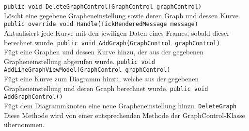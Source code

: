 \begin{itemize}
	\add \verb!public void DeleteGraphControl(GraphControl graphControl)! \\
	Löscht eine gegebene Grapheneinstellung sowie deren Graph und dessen Kurve.
	\add \verb!public override void Handle(TickRenderedMessage message)! \\
	Aktualisiert jede Kurve mit den jewiligen Daten eines Frames, sobald dieser berechnet wurde.
	\change \verb!public void AddGraph(GraphControl graphControl)! \\
	Fügt eine Graphen und dessen Kurve hinzu, der aus der gegebenen Grapheneinstellung abgerufen wurde.
	\add \verb!public void AddLineGraphViewModel(GraphControl graphControl)! \\
	Fügt eine Kurve zum Diagramm hinzu, welche aus der gegebenen Grapheneinstellung und deren Graph berechnet wurde.
	\add \verb!public void AddGraphControl()! \\
	Fügt dem Diagrammknoten eine neue Grapheneinstellung hinzu.
	\remove \verb!DeleteGraph! \\
	Diese Methode wird von einer entsprechenden Methode der GraphControl-Klasse übernommen.
\end{itemize}

